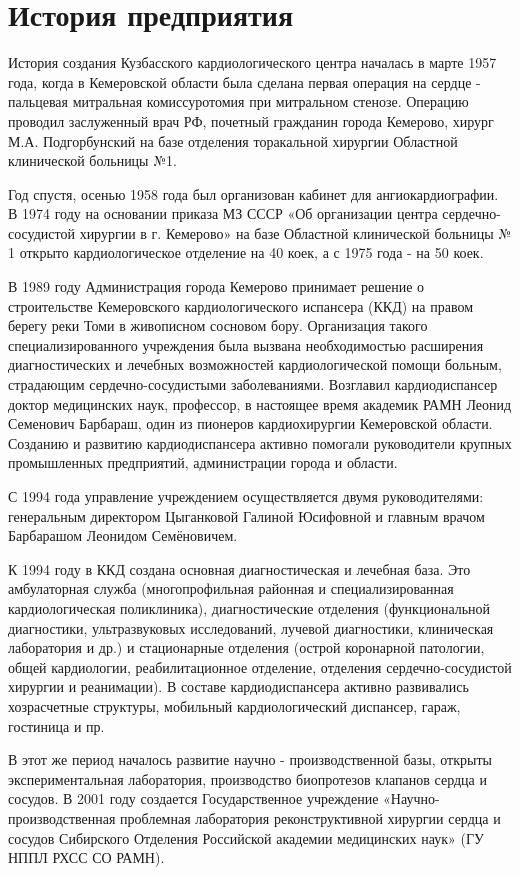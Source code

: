 \section{История предприятия}
История создания Кузбасского кардиологического центра началась в марте 1957
года, когда в Кемеровской области была сделана первая операция на сердце -
пальцевая митральная комиссуротомия при митральном стенозе. Операцию проводил
заслуженный врач РФ, почетный гражданин города Кемерово, хирург М.А.
Подгорбунский на базе отделения торакальной хирургии Областной клинической
больницы №1.

Год спустя, осенью 1958 года был организован кабинет для ангиокардиографии. В
1974 году на основании приказа МЗ СССР «Об организации центра
сердечно-сосудистой хирургии в г. Кемерово» на базе Областной клинической
больницы № 1 открыто кардиологическое отделение на 40 коек, а с 1975 года - на
50 коек.

В 1989 году Администрация города Кемерово принимает решение о строительстве
Кемеровского кардиологического  испансера (ККД) на правом берегу реки Томи в
живописном сосновом бору. Организация такого специализированного учреждения была
вызвана необходимостью расширения диагностических и лечебных возможностей
кардиологической помощи больным, страдающим сердечно-сосудистыми заболеваниями.
Возглавил кардиодиспансер доктор медицинских наук, профессор, в настоящее время
академик РАМН Леонид Семенович Барбараш, один из пионеров кардиохирургии
Кемеровской области. Созданию и развитию кардиодиспансера активно помогали
руководители крупных промышленных предприятий, администрации города и области.

С 1994 года управление учреждением осуществляется двумя руководителями:
генеральным директором Цыганковой Галиной Юсифовной и главным врачом Барбарашом
Леонидом Семёновичем.

К 1994 году в ККД создана основная диагностическая и лечебная база. Это
амбулаторная служба (многопрофильная районная и специализированная
кардиологическая поликлиника), диагностические отделения (функциональной
диагностики, ультразвуковых исследований, лучевой диагностики, клиническая
лаборатория и др.) и стационарные отделения (острой коронарной патологии, общей
кардиологии, реабилитационное отделение, отделения сердечно-сосудистой хирургии
и реанимации). В составе кардиодиспансера активно развивались хозрасчетные
структуры, мобильный кардиологический диспансер, гараж, гостиница и пр.
   
В этот же период началось развитие научно - производственной базы, открыты
экспериментальная лаборатория, производство биопротезов клапанов сердца и
сосудов. В 2001 году создается Государственное учреждение
«Научно-производственная проблемная лаборатория реконструктивной хирургии
сердца и сосудов Сибирского Отделения Российской академии медицинских наук»
(ГУ НППЛ РХСС СО РАМН).

